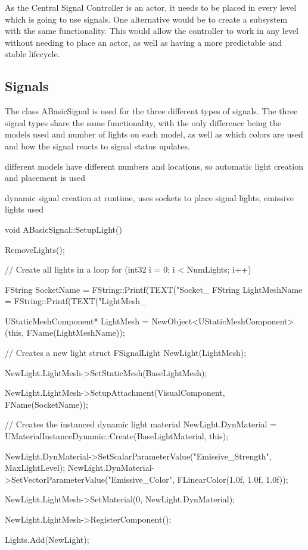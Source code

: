 As the Central Signal Controller is an actor, it needs to be placed in every level which is going to use signals. One alternative would be to create a subsystem with the same functionality. This would allow the controller to work in any level without needing to place an actor, as well as having a more predictable and stable lifecycle. 

\subsection{Signals}

The class ABasicSignal is used for the three different types of signals. The three signal types share the same functionality, with the only difference being the models used and number of lights on each model, as well as which colors are used and how the signal reacts to signal status updates. 


different models have different numbers and locations, so automatic light creation and placement is used

dynamic signal creation at runtime, uses sockets to place signal lights, emissive lights used

\begin{code}
void ABasicSignal::SetupLight()
{
	RemoveLights();

	// Create all lights in a loop
	for (int32 i = 0; i < NumLights; i++)
	{
		FString SocketName = FString::Printf(TEXT("Socket_%
		FString LightMeshName = FString::Printf(TEXT("LightMesh_%

		UStaticMeshComponent* LightMesh = NewObject<UStaticMeshComponent>(this, FName(LightMeshName));

		// Creates a new light struct
		FSignalLight NewLight(LightMesh);

		NewLight.LightMesh->SetStaticMesh(BaseLightMesh);

		NewLight.LightMesh->SetupAttachment(VisualComponent, FName(SocketName));

		// Creates the instanced dynamic light material
		NewLight.DynMaterial = UMaterialInstanceDynamic::Create(BaseLightMaterial, this);

		NewLight.DynMaterial->SetScalarParameterValue("Emissive_Strength", MaxLightLevel);
		NewLight.DynMaterial->SetVectorParameterValue("Emissive_Color", FLinearColor(1.0f, 1.0f, 1.0f));

		NewLight.LightMesh->SetMaterial(0, NewLight.DynMaterial);

		NewLight.LightMesh->RegisterComponent();


		Lights.Add(NewLight);
	}
}
\end{code}

